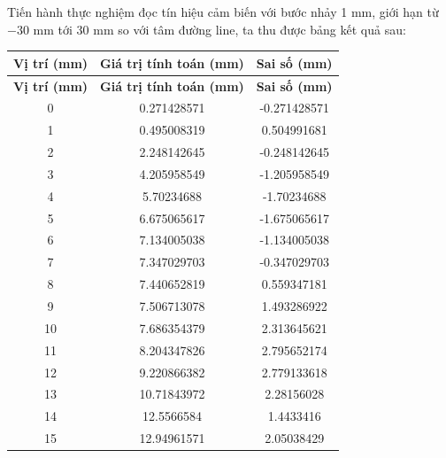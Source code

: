             \hspace*{0.6cm}Tiến hành thực nghiệm đọc tín hiệu cảm biến với bước nhảy 1 mm, giới hạn từ $-30$ mm tới $30$ mm so với tâm đường line, ta thu được bảng kết quả sau:
        
            \begin{longtable}{|c|c|c|}
                \hline
                \textbf{Vị trí (mm)} & \textbf{Giá trị tính toán (mm)} & \textbf{Sai số (mm)} \\
                \hline
                \endfirsthead
                
                \hline
                \textbf{Vị trí (mm)}  & \textbf{Giá trị tính toán (mm)} & \textbf{Sai số (mm)} \\
                \hline
                \endhead
                0 & 0.271428571 & -0.271428571 \\
                \hline
                1 & 0.495008319 & 0.504991681 \\
                \hline
                2 & 2.248142645 & -0.248142645 \\
                \hline
                3 & 4.205958549 & -1.205958549 \\
                \hline
                4 & 5.70234688 & -1.70234688 \\
                \hline
                5 & 6.675065617 & -1.675065617 \\
                \hline
                6 & 7.134005038 & -1.134005038 \\
                \hline
                7 & 7.347029703 & -0.347029703 \\
                \hline
                8 & 7.440652819 & 0.559347181 \\
                \hline
                9 & 7.506713078 & 1.493286922 \\
                \hline
                10 & 7.686354379 & 2.313645621 \\
                \hline
                11 & 8.204347826 & 2.795652174 \\
                \hline
                12 & 9.220866382 & 2.779133618 \\
                \hline
                13 & 10.71843972 & 2.28156028 \\
                \hline
                14 & 12.5566584 & 1.4433416 \\
                \hline
                15 & 12.94961571 & 2.05038429 \\
                \hline

\end{longtable}
